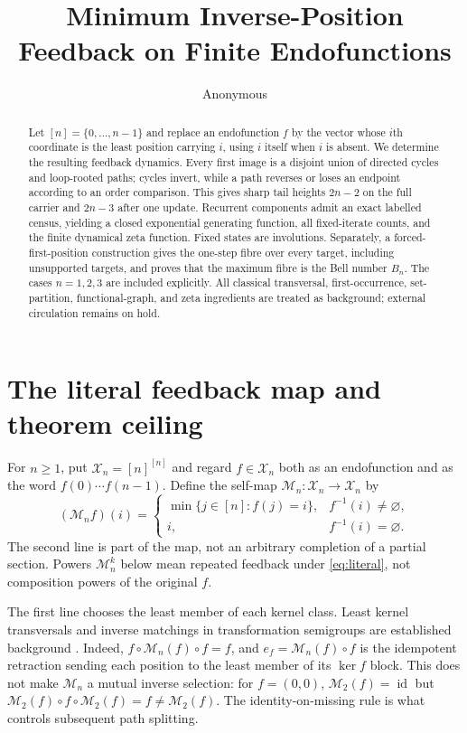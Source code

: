 \documentclass[a4paper,10pt]{amsart}
\title[Minimum inverse-position feedback]{Minimum Inverse-Position Feedback on Finite Endofunctions}
\author{Anonymous}
\date{}
\theoremstyle{remark}
\newcommand{\M}{\mathcal M}
\newcommand{\X}{\mathcal X}
\newcommand{\id}{\operatorname{id}}
\begin{document}
\begin{abstract}
Let $[n]=\{0,\ldots,n-1\}$ and replace an endofunction $f$ by the vector
whose $i$th coordinate is the least position carrying $i$, using $i$
itself when $i$ is absent.  We determine the resulting feedback dynamics.
Every first image is a disjoint union of directed cycles and loop-rooted
paths; cycles invert, while a path reverses or loses an endpoint according
to an order comparison.  This gives sharp tail heights $2n-2$ on the full
carrier and $2n-3$ after one update.  Recurrent components admit an exact
labelled census, yielding a closed exponential generating function,
all fixed-iterate counts, and the finite dynamical zeta function.  Fixed
states are involutions.  Separately, a forced-first-position construction
gives the one-step fibre over every target, including unsupported targets,
and proves that the maximum fibre is the Bell number $B_n$.  The cases
$n=1,2,3$ are included explicitly.  All classical transversal,
first-occurrence, set-partition, functional-graph, and zeta ingredients are
treated as background; external circulation remains on hold.
\end{abstract}

\maketitle

\section{The literal feedback map and theorem ceiling}

For $n\geq1$, put $\X_n=[n]^{[n]}$ and regard
$f\in\X_n$ both as an endofunction and as the word
$f(0)\cdots f(n-1)$.  Define the self-map $\M_n:\X_n\to\X_n$ by
\begin{equation}\label{eq:literal}
 (\M_n f)(i)=
 \begin{cases}
   \min\{j\in[n]:f(j)=i\},&f^{-1}(i)\ne\varnothing,\\
   i,&f^{-1}(i)=\varnothing.
 \end{cases}
\end{equation}
The second line is part of the map, not an arbitrary completion of a
partial section.  Powers $\M_n^k$ below mean repeated feedback under
\eqref{eq:literal}, not composition powers of the original $f$.

The first line chooses the least member of each kernel class.  Least kernel
transversals and inverse matchings in transformation semigroups are
established background \cite{FernandesEtAl2009,Higgins2019}.  Indeed,
$f\circ\M_n(f)\circ f=f$, and
$e_f=\M_n(f)\circ f$ is the idempotent retraction sending each position to
the least member of its $\ker f$ block.  This does not make $\M_n$ a mutual
inverse selection: for $f=(0,0)$, $\M_2(f)=\id$ but
$\M_2(f)\circ f\circ\M_2(f)=f\ne\M_2(f)$.  The identity-on-missing rule is
what controls subsequent path splitting.
\end{document}
